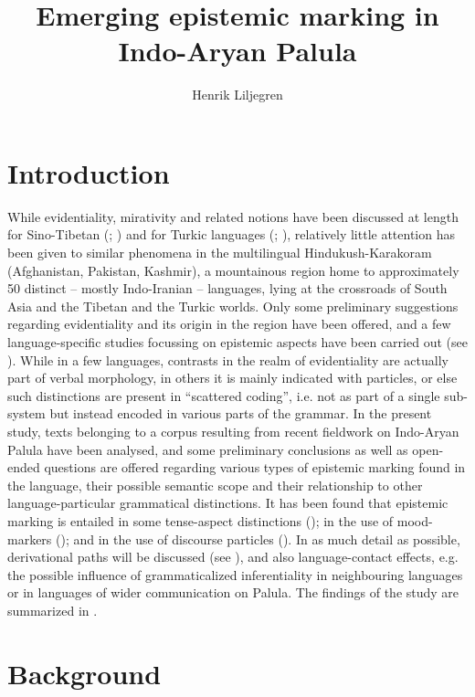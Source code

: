 \documentclass[output=paper]{langsci/langscibook}
\author{Henrik Liljegren \affiliation{University of Stockholm}}
\title{Emerging epistemic marking in Indo-Aryan Palula}
\begin{document}
\maketitle

\section{Introduction} 

While evidentiality, mirativity and related notions have been discussed at length for Sino-Tibetan (\citealt{DeLancey1986}; \citeyear{DeLancey2001}) and for Turkic languages (\citealt{Johanson2000}; \citeyear{Johanson2003}), relatively little attention has been given to similar phenomena in the multilingual Hindukush-Karakoram (Afghanistan, Pakistan, Kashmir), a mountainous region home to approximately 50 distinct – mostly Indo-Iranian – languages, lying at the crossroads of South Asia and the Tibetan and the Turkic worlds. Only some preliminary suggestions regarding evidentiality and its origin in the region have been offered, and a few language-specific studies focussing on epistemic aspects have been carried out (see ). While in a few languages, contrasts in the realm of evidentiality are actually part of verbal morphology, in others it is mainly indicated with particles, or else such distinctions are present in “scattered coding”, i.e. not as part of a single sub-system but instead encoded in various parts of the grammar. In the present study, texts belonging to a corpus resulting from recent fieldwork on Indo-Aryan Palula have been analysed, and some preliminary conclusions as well as open-ended questions are offered regarding various types of epistemic marking found in the language, their possible semantic scope and their relationship to other language-particular grammatical distinctions. It has been found that epistemic marking is entailed in some tense-aspect distinctions (); in the use of mood-markers (); and in the use of discourse particles (). In as much detail as possible, derivational paths will be discussed (see ), and also language-contact effects, e.g. the possible influence of grammaticalized inferentiality in neighbouring languages or in languages of wider communication on Palula. The findings of the study are summarized in .

\section{Background}\label{s:hl2}
\end{document}
